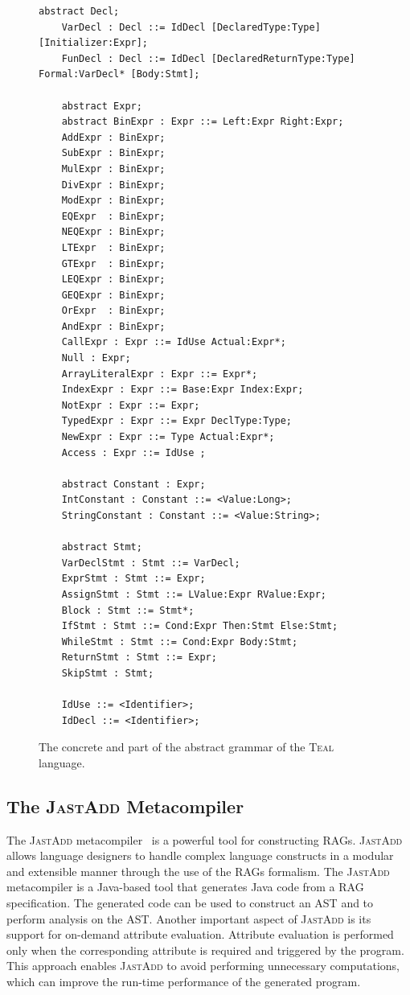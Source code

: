\begin{figure}[H]
\begin{minipage}{0.8\textwidth}
\begin{lrbox}{\mylistingbox}
\begin{lstlisting}[language=ASTGrammar]
    abstract Decl;
    VarDecl : Decl ::= IdDecl [DeclaredType:Type] [Initializer:Expr];
    FunDecl : Decl ::= IdDecl [DeclaredReturnType:Type] Formal:VarDecl* [Body:Stmt];

    abstract Expr;
    abstract BinExpr : Expr ::= Left:Expr Right:Expr;
    AddExpr : BinExpr;
    SubExpr : BinExpr;
    MulExpr : BinExpr;
    DivExpr : BinExpr;
    ModExpr : BinExpr;
    EQExpr  : BinExpr;
    NEQExpr : BinExpr;
    LTExpr  : BinExpr;
    GTExpr  : BinExpr;
    LEQExpr : BinExpr;
    GEQExpr : BinExpr;
    OrExpr  : BinExpr;
    AndExpr : BinExpr;
    CallExpr : Expr ::= IdUse Actual:Expr*;
    Null : Expr;
    ArrayLiteralExpr : Expr ::= Expr*;
    IndexExpr : Expr ::= Base:Expr Index:Expr;
    NotExpr : Expr ::= Expr;
    TypedExpr : Expr ::= Expr DeclType:Type;
    NewExpr : Expr ::= Type Actual:Expr*;
    Access : Expr ::= IdUse ;

    abstract Constant : Expr;
    IntConstant : Constant ::= <Value:Long>;
    StringConstant : Constant ::= <Value:String>;

    abstract Stmt;
    VarDeclStmt : Stmt ::= VarDecl;
    ExprStmt : Stmt ::= Expr;
    AssignStmt : Stmt ::= LValue:Expr RValue:Expr;
    Block : Stmt ::= Stmt*;
    IfStmt : Stmt ::= Cond:Expr Then:Stmt Else:Stmt;
    WhileStmt : Stmt ::= Cond:Expr Body:Stmt;
    ReturnStmt : Stmt ::= Expr;
    SkipStmt : Stmt;

    IdUse ::= <Identifier>;
    IdDecl ::= <Identifier>;
        \end{lstlisting}
\end{lrbox}
\scalebox{0.75}{\usebox{\mylistingbox}}

        \end{minipage}
\caption{\label{fig:tealGrammar} The concrete and part of the abstract grammar of the \textsc{Teal} language.}
\end{figure}


\subsection{The \textsc{JastAdd} Metacompiler}
\label{sec:jastadd}
The \textsc{JastAdd} metacompiler~\cite{DBLP:journals/entcs/HedinM01} is a powerful tool for constructing
RAGs.
\textsc{JastAdd} allows language designers to handle complex language constructs in a modular and extensible
manner through the use of the RAGs formalism.
The \textsc{JastAdd} metacompiler is a Java-based tool that generates
Java code from a RAG specification. The generated code can be used to construct an AST and to perform
analysis on the AST.
Another important aspect of \textsc{JastAdd} is its support for on-demand attribute evaluation.
Attribute evaluation is performed only when the corresponding
attribute is required and triggered by the program. This approach enables \textsc{JastAdd} to
avoid performing unnecessary computations, which can improve the run-time
performance of the generated program.

